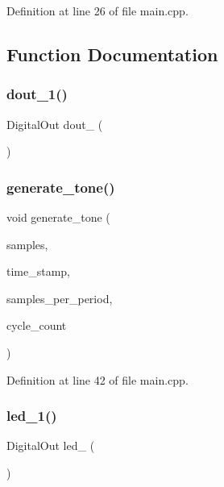 Definition at line 26 of file main.\+cpp.



\subsection{Function Documentation}
\mbox{\label{main_8cpp_a283aa56f6d1126af650efc27cbcbc589}} 
\subsubsection{dout\_1()}
{\footnotesize\ttfamily Digital\+Out dout\+\_ (\begin{DoxyParamCaption}\item[{D7}]{ }\end{DoxyParamCaption})}

\mbox{\label{main_8cpp_aee802efc7a3ae6275ca8ac8fb06c702c}} 
\subsubsection{generate\_tone()}
{\footnotesize\ttfamily void generate\+\_\+tone (\begin{DoxyParamCaption}\item[{float $\ast$}]{samples,  }\item[{uint16\+\_\+t $\ast$}]{time\+\_\+stamp,  }\item[{uint16\+\_\+t}]{samples\+\_\+per\+\_\+period,  }\item[{uint16\+\_\+t}]{cycle\+\_\+count }\end{DoxyParamCaption})}



Definition at line 42 of file main.\+cpp.

\mbox{\label{main_8cpp_a9aafede96ff802cd6dcaa7dcd6b92597}} 
\subsubsection{led\_1()}
{\footnotesize\ttfamily Digital\+Out led\+\_ (\begin{DoxyParamCaption}\item[{L\+E\+D1}]{ }\end{DoxyParamCaption})}

